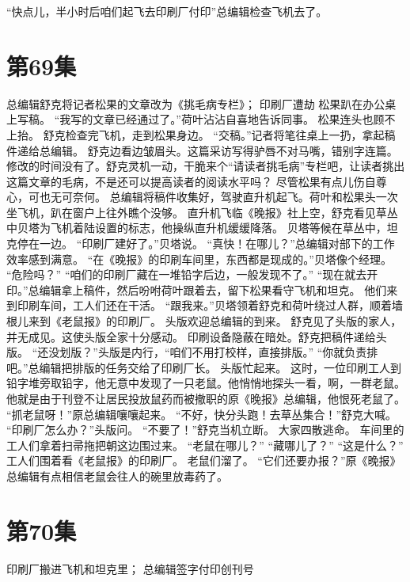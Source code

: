 \documentclass[a4paper,12pt,UTF8,twoside]{ctexbook}
\begin{document}
        “快点儿，半小时后咱们起飞去印刷厂付印”总编辑检查飞机去了。   \chapter{第69集} 
        总编辑舒克将记者松果的文章改为《挑毛病专栏》； 
        印刷厂遭劫   
        松果趴在办公桌上写稿。 
        “我写的文章已经通过了。”荷叶沾沾自喜地告诉同事。 
        松果连头也顾不上抬。 
        舒克检查完飞机，走到松果身边。 
        “交稿。”记者将笔往桌上一扔，拿起稿件递给总编辑。 
        舒克边看边皱眉头。这篇采访写得驴唇不对马嘴，错别字连篇。 
        修改的时间没有了。舒克灵机一动，干脆来个“请读者挑毛病”专栏吧，让读者挑出这篇文章的毛病，不是还可以提高读者的阅读水平吗？ 
        尽管松果有点儿伤自尊心，可也无可奈何。 
        总编辑将稿件收集好，驾驶直升机起飞。荷叶和松果头一次坐飞机，趴在窗户上往外瞧个没够。 
        直升机飞临《晚报》社上空，舒克看见草丛中贝塔为飞机着陆设置的标志，他操纵直升机缓缓降落。 
        贝塔等候在草丛中，坦克停在一边。 
        “印刷厂建好了。”贝塔说。 
        “真快！在哪儿？”总编辑对部下的工作效率感到满意。 
        “在《晚报》的印刷车间里，东西都是现成的。”贝塔像个经理。 
        “危险吗？” 
        “咱们的印刷厂藏在一堆铅字后边，一般发现不了。” 
        “现在就去开印。”总编辑拿上稿件，然后吩咐荷叶跟着去，留下松果看守飞机和坦克。 
        他们来到印刷车间，工人们还在干活。 
        “跟我来。”贝塔领着舒克和荷叶绕过人群，顺着墙根儿来到《老鼠报》的印刷厂。 
        头版欢迎总编辑的到来。 
        舒克见了头版的家人，并无成见。这使头版全家十分感动。 
        印刷设备隐蔽在暗处。舒克把稿件递给头版。 
        “还没划版？”头版是内行，“咱们不用打校样，直接排版。” 
        “你就负责排吧。”总编辑把排版的任务交给了印刷厂长。 
        头版忙起来。 
        这时，一位印刷工人到铅字堆旁取铅字，他无意中发现了一只老鼠。他悄悄地探头一看，啊，一群老鼠。 
        他就是由于刊登不让居民投放鼠药而被撤职的原《晚报》总编辑，他恨死老鼠了。 
        “抓老鼠呀！”原总编辑嚷嚷起来。 
        “不好，快分头跑！去草丛集合！”舒克大喊。 
        “印刷厂怎么办？”头版问。 
        “不要了！”舒克当机立断。 
        大家四散逃命。 
        车间里的工人们拿着扫帚拖把朝这边围过来。 
        “老鼠在哪儿？” 
        “藏哪儿了？” 
        “这是什么？” 
        工人们围着看《老鼠报》的印刷厂。 
        老鼠们溜了。 
        “它们还要办报？”原《晚报》总编辑有点相信老鼠会往人的碗里放毒药了。   \chapter{第70集} 
        印刷厂搬进飞机和坦克里； 
        总编辑签字付印创刊号   
\end{document}
